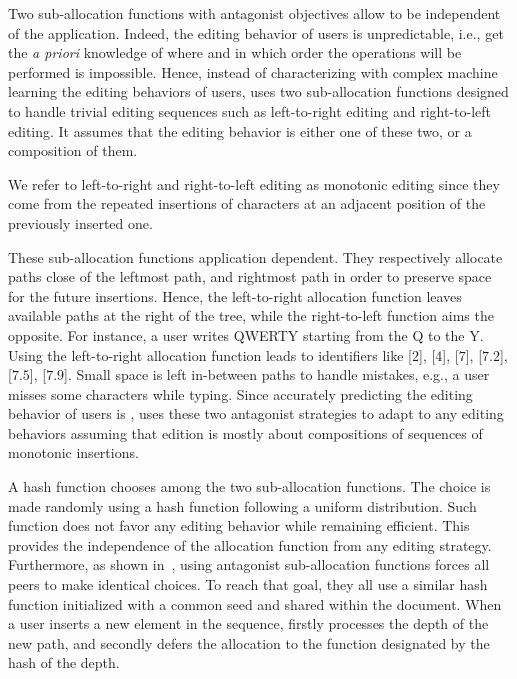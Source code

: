 \begin{asparadesc}
\item [Two sub-allocation functions] with antagonist objectives allow \LSEQ to
  be independent of the application. Indeed, the editing behavior of users is
  unpredictable, i.e., get the \emph{a priori} knowledge of where and in which
  order the operations will be performed is impossible. Hence, instead of
  characterizing with complex machine learning the editing behaviors of users,
  \LSEQ uses two sub-allocation functions designed to handle trivial editing
  sequences such as left-to-right editing and right-to-left editing. It assumes
  that the editing behavior is either one of these two, or a composition of
  them. 

  We refer to left-to-right and right-to-left editing as monotonic editing since
  they come from the repeated insertions of characters at an adjacent position of
  the previously inserted one.

  These sub-allocation functions application dependent. They respectively
  allocate paths close of the leftmost path, and rightmost path in order to
  preserve space for the future insertions. Hence, the left-to-right allocation
  function leaves available paths at the right of the tree, while the
  right-to-left function aims the opposite. For instance, a user writes QWERTY
  starting from the Q to the Y. Using the left-to-right allocation function
  leads to identifiers like [$2$], [$4$], [$7$], [$7.2$], [$7.5$],
  [$7.9$]. Small space is left in-between paths to handle mistakes, e.g., a user
  misses some characters while typing.  Since accurately predicting the editing
  behavior of users is , \LSEQ uses these two antagonist
  strategies to adapt to any editing behaviors assuming that edition is mostly
  about compositions of sequences of monotonic insertions.
  
\item [A hash function] chooses among the two sub-allocation functions. The
  choice is made randomly using a hash function following a uniform
  distribution. Such function does not favor any editing behavior while
  remaining efficient. This provides the independence of the allocation function
  from any editing strategy. Furthermore, as shown
  in~\cite{nedelec2013concurrency}, using antagonist sub-allocation functions
  forces all peers to make identical choices. To reach that goal, they all use a
  similar hash function initialized with a common seed and shared within the
  document. When a user inserts a new element in the sequence, \LSEQ firstly
  processes the depth of the new path, and secondly defers the allocation to the
  function designated by the hash of the depth.


\end{asparadesc}
